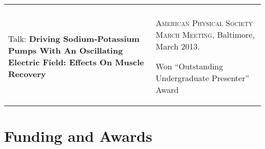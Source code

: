 \documentclass[letterpaper,10pt]{article} %
\makeatletter
\newcommand\cellwidth{\TX@col@width}
\makeatother
\begin{document}
\begin{tabularx}{\textwidth}{p{} | X}
\multicolumn{2}{c}{} \\

\begin{minipage}{.4\textwidth}
Talk: \textbf{Driving Sodium-Potassium Pumps With An Oscillating Electric Field: Effects On Muscle Recovery}
\end{minipage}
&
\begin{minipage}{\cellwidth}
\begin{description}[itemsep=.25ex,labelsep=0em]
\item \textsc{American Physical Society March Meeting}, Baltimore, March 2013.
\item Won ``Outstanding Undergraduate Presenter'' Award
\end{description}
\end{minipage} 
\end{tabularx}


\section*{Funding and Awards}

\end{document}
